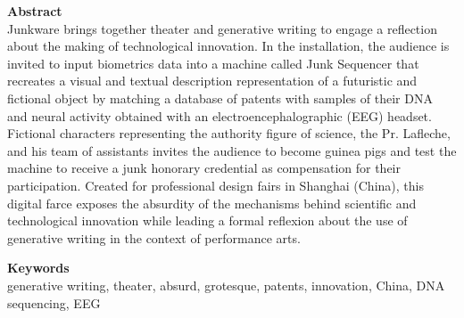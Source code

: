 \textbf{Abstract}\\
Junkware brings together theater and generative writing to engage a reflection about the making of technological innovation. In the installation, the audience is invited to input biometrics data into a machine called Junk Sequencer that recreates a visual and textual description representation of a futuristic and fictional object by matching a database of patents with samples of their DNA and neural activity obtained with an electroencephalographic (EEG) headset. Fictional characters representing the authority figure of science, the Pr. Lafleche, and his team of assistants invites the audience to become guinea pigs and test the machine to receive a junk honorary credential as compensation for their participation. Created for professional design fairs in Shanghai (China), this digital farce exposes the absurdity of the mechanisms behind scientific and technological innovation while leading a formal reflexion about the use of generative writing in the context of performance arts.



\textbf{Keywords}\\
generative writing, theater, absurd, grotesque, patents, innovation, China, DNA sequencing, EEG
